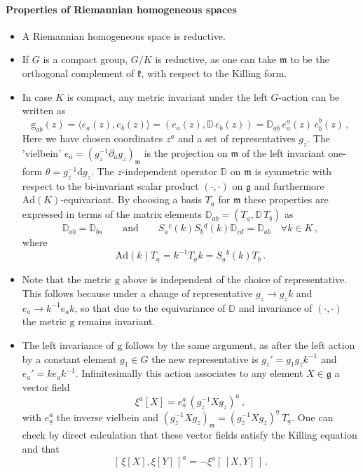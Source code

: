 \documentclass[11pt,a4paper]{article}
\def\ua{{\underline{a}}}
\def\ub{{\underline{b}}}
\def\uc{{\underline{c}}}
\def\ud{{\underline{d}}}
\def\rg{{\mathrm{g}}}
\def\rd{{\mathrm{d}}}
\def\Ad{{\mathrm{Ad}}}
\def\Dperp{{\mathbb{D}}}
\begin{document}
    \paragraph{Properties of Riemannian homogeneous spaces} 
    \begin{itemize}
    	\item A Riemannian homogeneous space is reductive.
    	\item If $G$ is a compact group, $G/K$ is reductive, as one can take $\mathfrak{m}$ to be the orthogonal complement of $\mathfrak{k}$, with respect to the Killing form.
    	\item In case $K$ is compact, any metric invariant under the left $G$-action can be written as
    	\begin{equation}
    	\rg_{ab}(z)=\langle e_a(z),e_b(z)\rangle=(e_a(z),\Dperp\, e_b(z))=\Dperp_{\ua\ub}\,e_a^\ua(z)\,e_b^\ub(z)\,,\label{appmetric}
    	\end{equation}
    	Here we have chosen coordinates $z^a$ and a set of representatives $g_z$. The 'vielbein' $e_a=(g_z^{-1}\partial_a g_z)_\mathfrak{m}$ is the projection on $\mathfrak{m}$ of the left invariant one-form $\theta=g_z^{-1}\rd g_z$. The $z$-independent operator $\Dperp$ on $\mathfrak{m}$ is symmetric with respect to the bi-invariant scalar product $(\cdot,\cdot)$ on $\mathfrak{g}$ and furthermore $\Ad(K)$-equivariant. By choosing a basis $T_\ua$ for $\mathfrak{m}$ these properties are expressed in terms of the matrix elements $\Dperp_{\ua\ub}=(T_\ua,\Dperp\,T_\ub)$ as
    	\begin{equation}
    	\mathbb{D}_{\ua\ub}=\mathbb{D}_{\ub\ua}\qquad\mbox{and}\qquad S_{\ua}{}^{\uc}(k)S_{\ub}{}^{\ud}(k)\mathbb{D}_{\uc\ud}=\mathbb{D}_{\ua\ub}\quad\forall k\in K\,,\label{Dtransf}
    	\end{equation}
    	where
    	\begin{equation}
    	\Ad(k)T_\ua=k^{-1}T_\ua k=S_{\ua}{}^{\ub}(k)T_\ub\,.
    	\end{equation}
    	\item Note that the metric $\rg$ above is independent of the choice of representative. This follows because under a change of representative $g_z\rightarrow g_z k$ and $e_a\rightarrow k^{-1}e_ak$, so that due to the equivariance of $\Dperp$ and invariance of $(\cdot,\cdot)$ the metric $\rg$ remains invariant.
    	\item The left invariance of $\rg$ follows by the same argument, as after the left action by a constant element $g_1\in G$ the new representative is $g_z'=g_1 g_z k^{-1}$ and $e_a'=ke_ak^{-1}$. Infinitesimally this action associates to any element $X\in \mathfrak{g}$ a vector field
    	\begin{equation}
    	\xi^a[X]=e^a_\ua\,(g_z^{-1}Xg_z)^\ua\,,
    	\end{equation}
    	with $e^a_\ua$ the inverse vielbein and  $(g_z^{-1}Xg_z)_\mathfrak{m}=(g_z^{-1}Xg_z)^\ua\,T_\ua$. One can check by direct calculation that these vector fields satisfy the Killing equation and that
    	\begin{equation}
    	\left[\,\xi[X],\xi[Y]\,\right]^a=-\xi^a\left[\,[X,Y]\,\right]\,.
    	\end{equation}
    	

\end{itemize}
\end{document}
